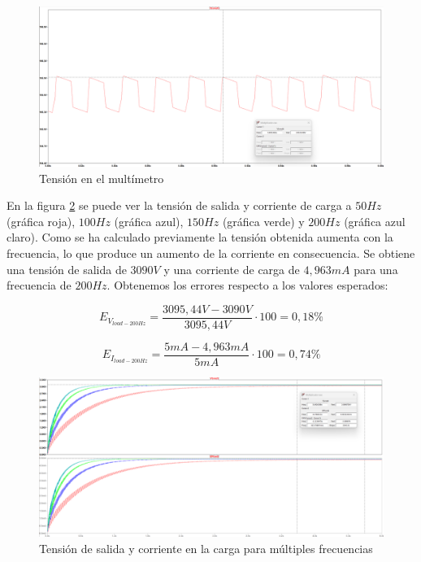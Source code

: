 \begin{figure}[H]
    \centering
    \includegraphics[width=1\textwidth]{Imagenes_alvaro/V_mult.png}
    \caption{Tensión en el multímetro}
    \label{V_mult}
\end{figure}

En la figura \ref{200hz} se puede ver la tensión de salida y corriente de carga a $50Hz$ (gráfica roja), $100Hz$ (gráfica azul), $150Hz$ (gráfica verde)
y $200Hz$ (gráfica azul claro). Como se ha calculado previamente la tensión obtenida aumenta con la frecuencia, lo que produce un aumento de la corriente en consecuencia.
Se obtiene una tensión de salida de $3090V$ y una corriente de carga de $4,963mA$ para una frecuencia de $200Hz$. Obtenemos los errores respecto a los valores esperados:

\begin{equation}
    E_{V_{load-200Hz}} = \frac{3095,44V - 3090V}{3095,44V} \cdot 100 = 0,18\%
\end{equation}

\begin{equation}
    E_{I_{load-200Hz}} = \frac{5mA - 4,963mA}{5mA} \cdot 100 = 0,74\%
\end{equation}

\begin{figure}[H]
    \centering
    \includegraphics[width=1\textwidth]{Imagenes_alvaro/200hz.png}
    \caption{Tensión de salida y corriente en la carga para múltiples frecuencias}
    \label{200hz}
\end{figure}

